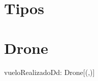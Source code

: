\documentclass[a4paper]{article}
\begin{document}

\section{Tipos}



\section{Drone}



\begin{problema}{vueloRealizadoD}{d: Drone}{[(\ent,\ent)]}
\end{problema}


%
\end{document}
